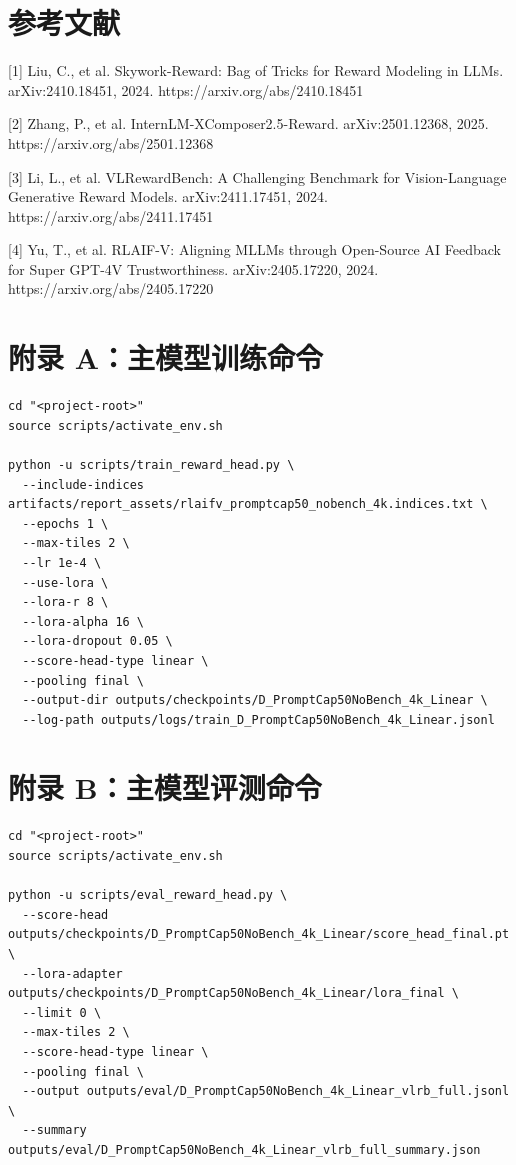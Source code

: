 \documentclass[11pt,a4paper]{ctexart}
\begin{document}
\section*{参考文献}

[1] Liu, C., et al. Skywork-Reward: Bag of Tricks for Reward Modeling in LLMs. arXiv:2410.18451, 2024. https://arxiv.org/abs/2410.18451

[2] Zhang, P., et al. InternLM-XComposer2.5-Reward. arXiv:2501.12368, 2025. https://arxiv.org/abs/2501.12368

[3] Li, L., et al. VLRewardBench: A Challenging Benchmark for Vision-Language Generative Reward Models. arXiv:2411.17451, 2024. https://arxiv.org/abs/2411.17451

[4] Yu, T., et al. RLAIF-V: Aligning MLLMs through Open-Source AI Feedback for Super GPT-4V Trustworthiness. arXiv:2405.17220, 2024. https://arxiv.org/abs/2405.17220

\section*{附录 A：主模型训练命令}

\begin{lstlisting}
cd "<project-root>"
source scripts/activate_env.sh

python -u scripts/train_reward_head.py \
  --include-indices artifacts/report_assets/rlaifv_promptcap50_nobench_4k.indices.txt \
  --epochs 1 \
  --max-tiles 2 \
  --lr 1e-4 \
  --use-lora \
  --lora-r 8 \
  --lora-alpha 16 \
  --lora-dropout 0.05 \
  --score-head-type linear \
  --pooling final \
  --output-dir outputs/checkpoints/D_PromptCap50NoBench_4k_Linear \
  --log-path outputs/logs/train_D_PromptCap50NoBench_4k_Linear.jsonl
\end{lstlisting}

\section*{附录 B：主模型评测命令}

\begin{lstlisting}
cd "<project-root>"
source scripts/activate_env.sh

python -u scripts/eval_reward_head.py \
  --score-head outputs/checkpoints/D_PromptCap50NoBench_4k_Linear/score_head_final.pt \
  --lora-adapter outputs/checkpoints/D_PromptCap50NoBench_4k_Linear/lora_final \
  --limit 0 \
  --max-tiles 2 \
  --score-head-type linear \
  --pooling final \
  --output outputs/eval/D_PromptCap50NoBench_4k_Linear_vlrb_full.jsonl \
  --summary outputs/eval/D_PromptCap50NoBench_4k_Linear_vlrb_full_summary.json
\end{lstlisting}
\end{document}
